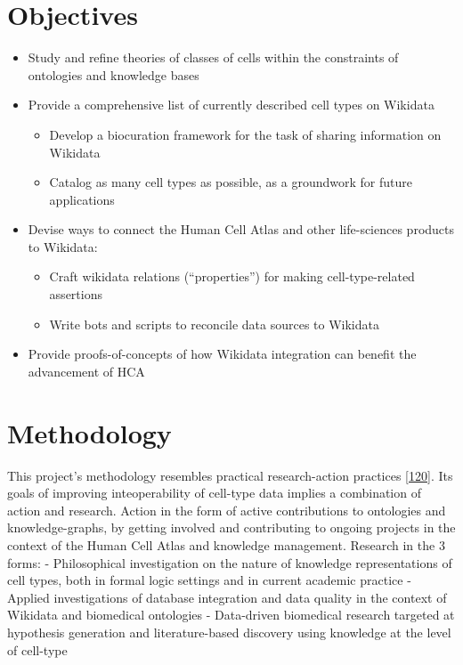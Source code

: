 \hypertarget{objectives}{%
\section{Objectives}\label{objectives}}

\begin{itemize}
\item
  Study and refine theories of classes of cells within the constraints of ontologies and knowledge bases
\item
  Provide a comprehensive list of currently described cell types on Wikidata

  \begin{itemize}
  \tightlist
  \item
    Develop a biocuration framework for the task of sharing information on Wikidata
  \item
    Catalog as many cell types as possible, as a groundwork for future applications
  \end{itemize}
\item
  Devise ways to connect the Human Cell Atlas and other life-sciences products to Wikidata:

  \begin{itemize}
  \tightlist
  \item
    Craft wikidata relations (``properties'') for making cell-type-related assertions
  \item
    Write bots and scripts to reconcile data sources to Wikidata
  \end{itemize}
\item
  Provide proofs-of-concepts of how Wikidata integration can benefit the advancement of HCA
\end{itemize}

\hypertarget{methodology}{%
\section{Methodology}\label{methodology}}

This project's methodology resembles practical research-action practices {[}\protect\hyperlink{ref-11UV98PHT}{120}{]}. Its goals of improving inteoperability of cell-type data implies a combination of action and research. Action in the form of active contributions to ontologies and knowledge-graphs, by getting involved and contributing to ongoing projects in the context of the Human Cell Atlas and knowledge management. Research in the 3 forms:
- Philosophical investigation on the nature of knowledge representations of cell types, both in formal logic settings and in current academic practice
- Applied investigations of database integration and data quality in the context of Wikidata and biomedical ontologies
- Data-driven biomedical research targeted at hypothesis generation and literature-based discovery using knowledge at the level of cell-type

